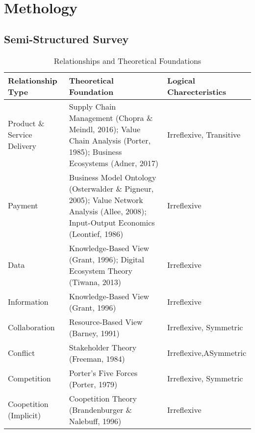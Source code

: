 \documentclass[runningheads]{llncs}
\begin{document}
\section{Methology}

\subsection{Semi-Structured Survey}

\begin{table}[ht]
    \centering
    \caption{Relationships and Theoretical Foundations}
    \label{tab:relationships}
    \begin{tabularx}{\textwidth}{lYY}
    \toprule
    \textbf{Relationship Type} & \textbf{Theoretical Foundation} & \textbf{Logical Charecteristics} \\
    \midrule
    Product \& Service Delivery & 
    Supply Chain Management (Chopra \& Meindl, 2016); 
    Value Chain Analysis (Porter, 1985); 
    Business Ecosystems (Adner, 2017) & 
    Irreflexive, Transitive \\
    \addlinespace
    
    Payment & 
    Business Model Ontology (Osterwalder \& Pigneur, 2005); 
    Value Network Analysis (Allee, 2008); 
    Input-Output Economics (Leontief, 1986) & 
    Irreflexive \\
    \addlinespace
    
    Data & 
    Knowledge-Based View (Grant, 1996); 
    Digital Ecosystem Theory (Tiwana, 2013) &
    Irreflexive \\
    \addlinespace
    
    Information & 
    Knowledge-Based View (Grant, 1996) & 
    Irreflexive \\
    \addlinespace
    
    Collaboration & 
    Resource-Based View (Barney, 1991) & 
    Irreflexive, Symmetric \\
    \addlinespace
    
    Conflict & 
    Stakeholder Theory (Freeman, 1984) & 
    Irreflexive,ASymmetric \\
    \addlinespace
    
    Competition & 
    Porter's Five Forces (Porter, 1979) & 
    Irreflexive, Symmetric \\
    \addlinespace
    
    Coopetition (Implicit) & 
    Coopetition Theory (Brandenburger \& Nalebuff, 1996) & 
    Irreflexive \\
    \bottomrule
    \end{tabularx}
    \smallskip
    \end{table}
\end{document}
